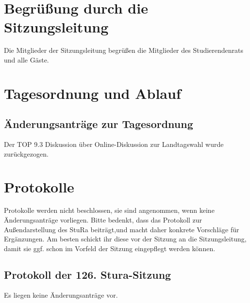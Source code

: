\section{Begrüßung durch die Sitzungsleitung}
Die Mitglieder  der  Sitzungsleitung begrüßen die  Mitglieder  des  Studierendenrats  und  alle Gäste.

\section{Tagesordnung und Ablauf}
\hypersetup{linkcolor=black}%
\tableofcontents
\hypersetup{linkcolor=blue}%
\subsection{Änderungsanträge zur Tagesordnung}
Der TOP 9.3 Diskussion über Online-Diskussion zur Landtagswahl wurde zurückgezogen.

\section{Protokolle}
Protokolle werden nicht beschlossen, sie sind angenommen, wenn keine Änderungsanträge vorliegen.
Bitte bedenkt, dass das Protokoll zur Außendarstellung des StuRa beiträgt,und macht daher konkrete Vorschläge
für Ergänzungen. Am besten schickt ihr diese vor der Sitzung an die Sitzungsleitung, damit sie ggf. schon im 
Vorfeld der Sitzung eingepflegt werden können.
\subsection{Protokoll der 126. Stura-Sitzung}
Es liegen keine Änderungsanträge vor.